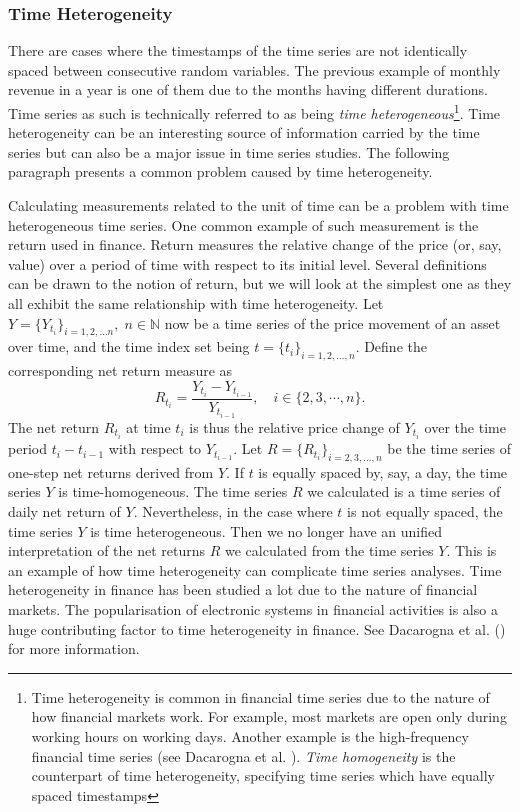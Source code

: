 \subsubsection{Time Heterogeneity}
There are cases where the timestamps of the time series are not identically spaced between consecutive random variables. The previous example of monthly revenue in a year is one of them due to the months having different durations. Time series as such is technically referred to as being \textit{time heterogeneous}\footnote{Time heterogeneity is common in financial time series due to the nature of how financial markets work. For example, most markets are open only during working hours on working days. Another example is the high-frequency financial time series (see Dacarogna et al. \citeyear{genccay2001introduction}). \textit{Time homogeneity} is the counterpart of time heterogeneity, specifying time series which have equally spaced timestamps}. Time heterogeneity can be an interesting source of information carried by the time series but can also be a major issue in time series studies. The following paragraph presents a common problem caused by time heterogeneity.

Calculating measurements related to the unit of time can be a problem with time heterogeneous time series. One common example of such measurement is the return used in finance. Return measures the relative change of the price (or, say, value) over a period of time with respect to its initial level. Several definitions can be drawn to the notion of return, but we will look at the simplest one as they all exhibit the same relationship with time heterogeneity. Let $Y = \{ Y_{t_i} \}_{i = 1, 2, \ldots n}, \; n \in \mathbb{N}$ now be a time series of the price movement of an asset over time, and the time index set being $t = \{ t_i \}_{i = 1, 2, \ldots, n}$. Define the corresponding net return measure as
\begin{equation}\label{eq: return}
R_{t_i} = \frac{Y_{t_i} - Y_{t_{i-1}}}{Y_{t_{i-1}}}, \quad i \in \{2, 3, \cdots, n \}.
\end{equation}
The net return $R_{t_i}$ at time $t_i$ is thus the relative price change of $Y_{t_i}$ over the time period $t_i - t_{i-1}$ with respect to $Y_{t_{i-1}}$. Let $R = \{ R_{t_i} \}_{i = 2, 3, \ldots, n}$ be the time series of one-step net returns derived from $Y$. If $t$ is equally spaced by, say, a day, the time series $Y$ is time-homogeneous. The time series $R$ we calculated is a time series of daily net return of $Y$. Nevertheless, in the case where $t$ is not equally spaced, the time series $Y$ is time heterogeneous. Then we no longer have an unified interpretation of the net returns $R$ we calculated from the time series $Y$. This is an example of how time heterogeneity can complicate time series analyses. Time heterogeneity in finance has been studied a lot due to the nature of financial markets. The popularisation of electronic systems in financial activities is also a huge contributing factor to time heterogeneity in finance. See Dacarogna et al. (\citeyear{genccay2001introduction}) for more information.

